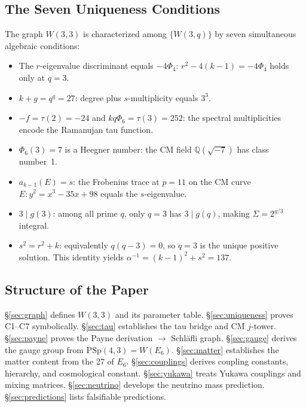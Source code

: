 \documentclass[12pt]{article}
\begin{document}
\subsection*{The Seven Uniqueness Conditions}

The graph $W(3,3)$ is characterized among $\{W(3,q)\}$ by seven
simultaneous algebraic conditions:
\begin{itemize}
\item[\textbf{C1.}] The $r$-eigenvalue discriminant equals $-4\Phi_4$:
  $r^2 - 4(k{-}1) = -4\Phi_4$ holds only at $q=3$.
\item[\textbf{C2.}] $k + g = q^q = 27$: degree plus $s$-multiplicity equals $3^3$.
\item[\textbf{C3.}] $-f = \tau(2) = -24$ and $kq\Phi_6 = \tau(3) = 252$:
  the spectral multiplicities encode the Ramanujan tau function.
\item[\textbf{C4.}] $\Phi_6(3) = 7$ is a Heegner number:
  the CM field $\mathbb{Q}(\sqrt{-7})$ has class number~1.
\item[\textbf{C5.}] $a_{k-1}(E) = s$: the Frobenius trace at $p=11$
  on the CM curve $E\colon y^2 = x^3 - 35x + 98$ equals the $s$-eigenvalue.
\item[\textbf{C6.}] $3 \mid g(3)$: among all prime $q$, only $q=3$ has
  $3 \mid g(q)$, making $\Sigma = 2^{g/3}$ integral.
\item[\textbf{C7.}] $s^2 = r^2 + k$: equivalently $q(q-3)=0$, so $q=3$
  is the unique positive solution. This identity yields
  $\alpha^{-1} = (k{-}1)^2 + s^2 = 137$.
\end{itemize}

\subsection*{Structure of the Paper}

\S\ref{sec:graph} defines $W(3,3)$ and its parameter table.
\S\ref{sec:uniqueness} proves C1--C7 symbolically.
\S\ref{sec:tau} establishes the tau bridge and CM $j$-tower.
\S\ref{sec:payne} proves the Payne derivation $\to$ Schl\"afli graph.
\S\ref{sec:gauge} derives the gauge group from $\mathrm{PSp}(4,3) = W(E_6)$.
\S\ref{sec:matter} establishes the matter content from the 27 of $E_6$.
\S\ref{sec:couplings} derives coupling constants, hierarchy, and cosmological constant.
\S\ref{sec:yukawa} treats Yukawa couplings and mixing matrices.
\S\ref{sec:neutrino} develops the neutrino mass prediction.
\S\ref{sec:predictions} lists falsifiable predictions.
\end{document}
